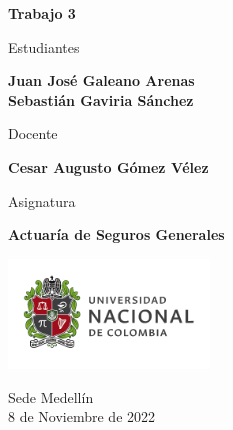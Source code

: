 \begin{titlepage}
   \Large{
   \begin{center}
       \vspace*{1cm}

       \textbf{Trabajo 3}

            
       \vspace{1.5cm}
       
       Estudiantes
       
       \vspace{0.5cm}
        
	\textbf{Juan José Galeano Arenas} \\

	\textbf{Sebastián Gaviria Sánchez}

              \vspace{1cm}
       
       Docente
       
       \vspace{0.5cm}

       \textbf{Cesar Augusto Gómez Vélez}
       
       \vspace{0.4cm}

       \vspace{1.4cm}
       
       Asignatura
       
       \vspace{0.5cm}

       \textbf{Actuaría de Seguros Generales}

       \vfill

            
       \vspace{0.4cm}
     
       \includegraphics[width=0.4\textwidth]{logounal.png}
            
       Sede Medellín\\
       8 de Noviembre de 2022
       
   \end{center}
   }
\end{titlepage}